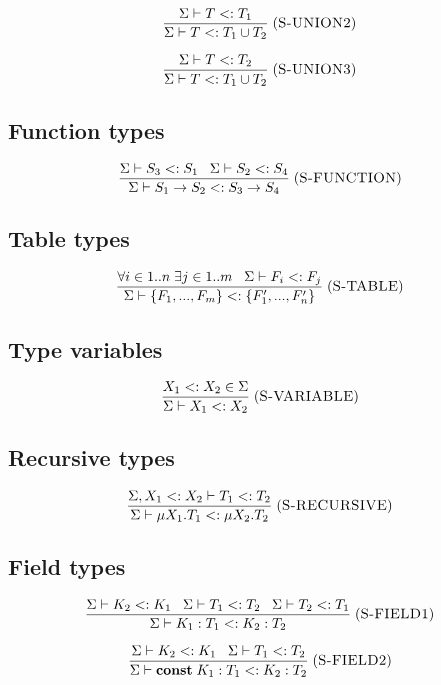 \documentclass[12pt]{article}
\newcommand{\Const}{\mathbf{const}}
\newcommand{\mylabel}[1]{\; (\textsc{#1})}
\newcommand{\subtype}{<:}
\newcommand{\senv}{\Sigma}
\begin{document}
\[
\frac{\senv \vdash T \subtype T_{1}}
     {\senv \vdash T \subtype T_{1} \cup T_{2}}
\mylabel{S-UNION2}
\]

\[
\frac{\senv \vdash T \subtype T_{2}}
     {\senv \vdash T \subtype T_{1} \cup T_{2}}
\mylabel{S-UNION3}
\]

\subsection{Function types}

\[
\frac{\senv \vdash S_{3} \subtype S_{1} \;\;\;
      \senv \vdash S_{2} \subtype S_{4}}
     {\senv \vdash S_{1} \rightarrow S_{2} \subtype S_{3} \rightarrow S_{4}}
\mylabel{S-FUNCTION}
\]

\subsection{Table types}

\[
\frac{\forall i \in 1..n \; \exists j \in 1..m \;\;\;
      \senv \vdash F_{i} \subtype F_{j}}
     {\senv \vdash \{F_{1}, ..., F_{m}\} \subtype \{F_{1}', ..., F_{n}'\}}
\mylabel{S-TABLE}
\]

\subsection{Type variables}

\[
\frac{X_{1} \subtype X_{2} \in \senv}
     {\senv \vdash X_{1} \subtype X_{2}}
\mylabel{S-VARIABLE}
\]

\subsection{Recursive types}

\[
\frac{\senv, X_{1} \subtype X_{2} \vdash T_{1} \subtype T_{2}}
     {\senv \vdash \mu X_{1}.T_{1} \subtype \mu X_{2}.T_{2}}
\mylabel{S-RECURSIVE}
\]

\subsection{Field types}

\[
\frac{\senv \vdash K_{2} \subtype K_{1} \;\;\;
      \senv \vdash T_{1} \subtype T_{2} \;\;\;
      \senv \vdash T_{2} \subtype T_{1}}
     {\senv \vdash K_{1}:T_{1} \subtype K_{2}:T_{2}}
\mylabel{S-FIELD1}
\]

\[
\frac{\senv \vdash K_{2} \subtype K_{1} \;\;\;
      \senv \vdash T_{1} \subtype T_{2}}
     {\senv \vdash \Const \; K_{1}:T_{1} \subtype K_{2}:T_{2}}
\mylabel{S-FIELD2}
\]
\end{document}
